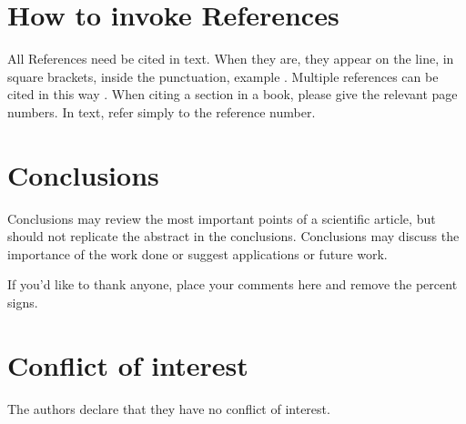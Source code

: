 \documentclass[twocolumn]{svClass}          %
\begin{document}
\section{How to invoke References}
All References need be cited in text. When they are, they appear on the line, in square brackets, inside the punctuation, example \cite{palomaki2017wind}. Multiple references can be cited in this way \cite{richardson2019spray,zhang2019application,khurshid2016effects}. 
When citing a section in a book, please give the relevant page numbers. In text, refer simply to the reference number. 

\section{Conclusions}
Conclusions may review the most important points of a scientific article, but should not replicate the abstract in the conclusions. Conclusions may discuss the importance of the work done or suggest applications or future work.


\begin{acknowledgements}
If you'd like to thank anyone, place your comments here
and remove the percent signs.
\end{acknowledgements}


 \section*{Conflict of interest}
The authors declare that they have no conflict of interest.



\label{refer}


\end{document}
